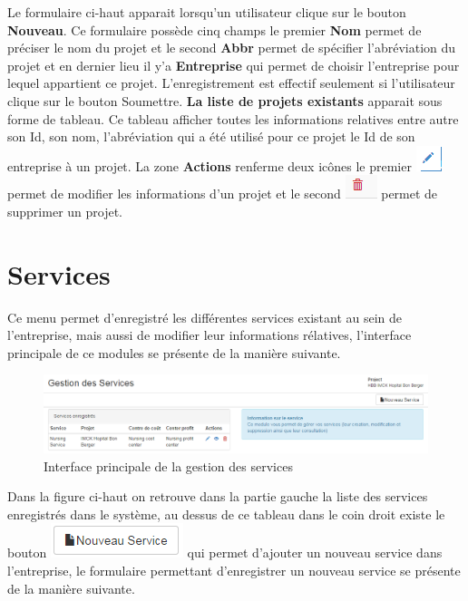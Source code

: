 \documentclass[12pt,a4paper]{report}
\begin{document}
Le formulaire ci-haut apparait lorsqu'un utilisateur clique sur le bouton \textbf{Nouveau}. Ce formulaire possède cinq champs le premier \textbf{Nom} permet de préciser le nom du projet et le second \textbf{Abbr} permet de spécifier l'abréviation du projet et en dernier lieu il y'a \textbf{Entreprise} qui permet de choisir l'entreprise pour lequel appartient ce projet.
L'enregistrement est effectif seulement si l'utilisateur clique sur le bouton Soumettre. \textbf{La liste de projets existants} apparait sous forme de tableau. Ce tableau afficher toutes les informations relatives entre autre son Id, son nom, l'abréviation qui a été utilisé pour ce projet le Id de son entreprise à un projet. La zone \textbf{Actions} renferme deux icônes le premier \includegraphics[scale=0.7]{pic/EditUser.png}  permet de modifier les informations d'un projet et le second \includegraphics[scale=0.7]{pic/DeleteWRed.png} permet de supprimer un projet.


\newpage

\section{Services}
Ce menu permet d'enregistré les différentes services existant au sein de l'entreprise, mais aussi de modifier leur informations rélatives, l'interface principale de ce modules se présente de la manière suivante.

\begin{figure}[h]
\begin{center}
\includegraphics[width=14cm]{pic/AdminService.png}
\end{center}
\caption{Interface principale de la gestion des services}
\label{Interface principale de la gestion des services}
\end{figure}

Dans la figure ci-haut on retrouve dans la partie gauche la liste des services enregistrés dans le système, au dessus de ce tableau dans le coin droit existe le bouton \includegraphics[scale=1]{pic/NewService.png} qui permet d'ajouter un nouveau service dans l'entreprise, le formulaire permettant d'enregistrer un nouveau service se présente de la manière suivante.
\end{document}
